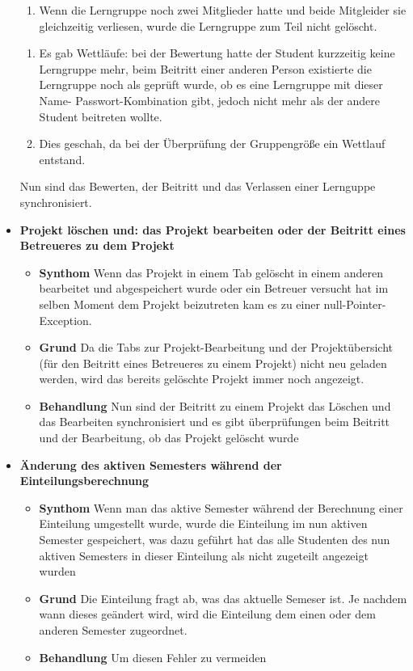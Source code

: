 \documentclass[parskip=full]{scrartcl}
\newcommand{\fehler}[4]{\textbf{#1}
 							\begin{itemize}
 							  \item \textbf{Synthom}  #2
 							  \item \textbf{Grund} #3
 							  \item \textbf{Behandlung} #4
 							\end{itemize}}
\newcommand{\code}[1]{{\ttfamily #1}}
\begin{document}
\begin{itemize}
{\begin{enumerate}
    Lerngruppe verlies und sie somit gelöscht wurde und  im selben Moment 
    Bewertungen für sie abzugeben wurden oder ein anderer Student versuchte ihr
    beizutreten kam es teilweise zu \code{null}-Pointer-Exceptions.
    \item Wenn die
    Lerngruppe noch zwei Mitglieder hatte und beide Mitgleider sie gleichzeitig
    verliesen, wurde die Lerngruppe zum Teil nicht gelöscht.
    \end{enumerate}  }
    {\begin{enumerate}
      \item Es gab Wettläufe: bei der Bewertung hatte der Student kurzzeitig
      keine Lerngruppe mehr, beim Beitritt einer anderen Person existierte die
      Lerngruppe noch als geprüft wurde, ob es eine Lerngruppe mit dieser Name-
      Passwort-Kombination gibt, jedoch nicht mehr als der andere Student
      beitreten wollte.
      \item Dies geschah, da bei der Überprüfung der Gruppengröße ein
      Wettlauf entstand.
    \end{enumerate} }{Nun sind das Bewerten, der Beitritt und das Verlassen einer Lernguppe synchronisiert.}
    \item \fehler{Projekt löschen und: das Projekt bearbeiten oder der Beitritt
    eines Betreueres zu dem Projekt }{Wenn das Projekt in einem Tab
    gelöscht in einem anderen bearbeitet und abgespeichert wurde oder ein
    Betreuer versucht hat im selben Moment dem Projekt beizutreten kam es zu
    einer \code{null}-Pointer-Exception.
    }{Da die Tabs zur Projekt-Bearbeitung und der Projektübersicht (für den
    Beitritt eines Betreueres zu einem Projekt) nicht neu geladen werden, wird
    das bereits gelöschte Projekt immer noch angezeigt.}{Nun sind der Beitritt
    zu einem Projekt das Löschen und das Bearbeiten synchronisiert und es gibt
    überprüfungen beim Beitritt und der Bearbeitung, ob das Projekt gelöscht
    wurde}
    \item \fehler{Änderung des aktiven Semesters während der
    Einteilungsberechnung }{Wenn man das aktive Semester während der
    Berechnung einer Einteilung umgestellt wurde, wurde die Einteilung im
    nun aktiven Semester gespeichert, was dazu geführt hat das alle
    Studenten des nun aktiven Semesters in dieser Einteilung als nicht
    zugeteilt angezeigt wurden}{Die Einteilung fragt ab, was das aktuelle
    Semeser ist. Je nachdem wann dieses geändert wird, wird die Einteilung dem
    einen oder dem anderen Semester zugeordnet.}{Um diesen Fehler zu vermeiden
}
\end{itemize}
\end{document}
